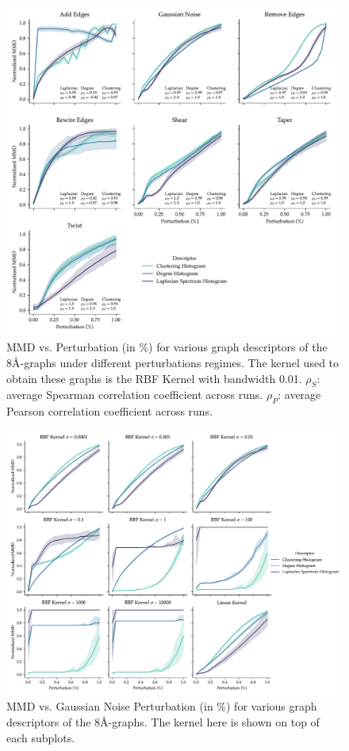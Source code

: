 \begin{figure}
  \centering
  \includegraphics[width=\textwidth]{./figures/results/res_1_1.pdf}
  \caption{MMD vs. Perturbation (in \%) for various graph descriptors of the 8\si{\angstrom}-graphs under different perturbations regimes. The kernel
    used to obtain these graphs is the RBF Kernel with bandwidth 0.01.
    $\rho_{S}$: average Spearman correlation coefficient across runs.
    $\rho_{P}$: average Pearson correlation coefficient across runs.}
  \label{fig:mmd_consistent_eps}
\end{figure}


\begin{figure}
  \centering
  \includegraphics[width=\textwidth]{./figures/results/res_1_2.pdf}
  \caption{MMD vs. Gaussian Noise Perturbation (in \%) for various graph descriptors of the
    8\si{\angstrom}-graphs. The kernel here is shown on top of each subplots.}
  \label{fig:mmd_effect_kernel}
\end{figure}


